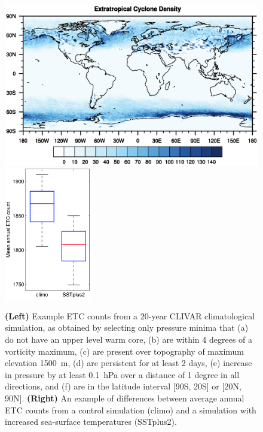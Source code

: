 \documentclass[11pt]{article}
\begin{document}
\begin{figure}[p]
\begin{center}
\includegraphics[trim=0.5cm 3.5cm 1cm 4.5cm, clip=true, width=4.5in]{density_plot}
\includegraphics[width=1.5in]{ETCChanges.png}
\end{center}
\caption{\textbf{(Left)} Example ETC counts from a 20-year CLIVAR climatological simulation, as obtained by selecting only pressure minima that (a) do not have an upper level warm core, (b) are within 4 degrees of a vorticity maximum, (c) are present over topography of maximum elevation 1500\ m, (d) are persistent for at least 2 days, (e) increase in pressure by  at least 0.1\ hPa over a distance of 1 degree in all directions, and (f) are in the latitude interval [90S, 20S] or [20N, 90N].  \textbf{(Right)} An example of differences between average annual ETC counts from a control simulation (climo) and a simulation with increased sea-surface temperatures (SSTplus2).} \label{fig:DensityPlot}
\end{figure}
\end{document}
